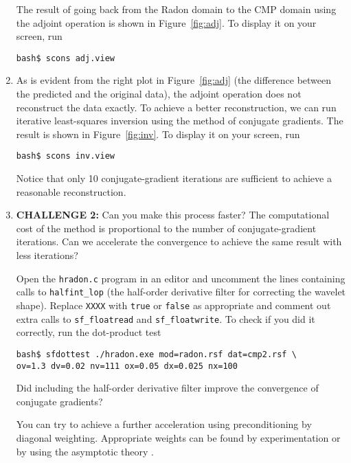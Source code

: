 \begin{enumerate}
The result of going back from the Radon domain to the CMP domain using the adjoint operation is shown in Figure~\ref{fig:adj}. To display it on your screen, run
\begin{verbatim}
bash$ scons adj.view
\end{verbatim}


\item As is evident from the right plot in Figure~\ref{fig:adj} (the difference between the predicted and the original data), the adjoint operation does not reconstruct the data exactly. To achieve a better reconstruction, we can run iterative least-squares inversion using the method of conjugate gradients. The result is shown in Figure~\ref{fig:inv}. To display it on your screen, run
\begin{verbatim}
bash$ scons inv.view
\end{verbatim}

Notice that only 10 conjugate-gradient iterations are sufficient to achieve a reasonable reconstruction.

\item \textbf{CHALLENGE 2:} Can you make this process faster? The computational cost of the method is proportional to the number of conjugate-gradient iterations. Can we accelerate the convergence to achieve the same result with less iterations?

Open the \texttt{hradon.c} program in an editor and uncomment the lines containing calls to \texttt{halfint\_lop} (the half-order derivative filter for correcting the wavelet shape). Replace \texttt{XXXX} with \texttt{true} or \texttt{false} as appropriate and comment out extra calls to \texttt{sf\_floatread} and \texttt{sf\_floatwrite}. To check if you did it correctly, run the dot-product test
\begin{verbatim}
bash$ sfdottest ./hradon.exe mod=radon.rsf dat=cmp2.rsf \
ov=1.3 dv=0.02 nv=111 ox=0.05 dx=0.025 nx=100
\end{verbatim}
Did including the half-order derivative filter improve the convergence of conjugate gradients? 

You can try to achieve  a further acceleration using preconditioning by diagonal weighting. Appropriate weights can be found by experimentation or by using the asymptotic theory \cite[]{GEO68-03-10321042}. 


\end{enumerate}
